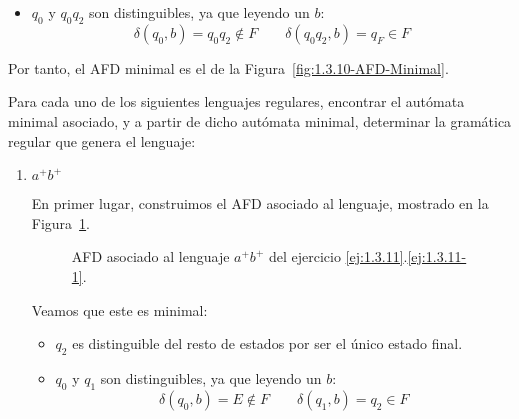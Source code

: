 \begin{ejercicio}
\begin{itemize}
        \item $q_0$ y $q_0q_2$ son distinguibles, ya que leyendo un $b$:
        \begin{equation*}
            \delta(q_0,b)=q_0q_2\notin F\qquad \delta(q_0q_2,b)=q_F\in F
        \end{equation*}
    \end{itemize}

    Por tanto, el AFD minimal es el de la Figura~\ref{fig:1.3.10-AFD-Minimal}.
\end{ejercicio}

\begin{ejercicio}\label{ej:1.3.11}
    Para cada uno de los siguientes lenguajes regulares, encontrar el autómata minimal asociado, y a partir de dicho autómata minimal, determinar la gramática regular que genera el lenguaje:
    \begin{enumerate}
        \item \label{ej:1.3.11-1}
        $a^+ b^+$
        
        En primer lugar, construimos el AFD asociado al lenguaje, mostrado en la Figura~\ref{fig:1.3.11-1-AFD}.
        \begin{figure}
            \centering
            \caption{AFD asociado al lenguaje $a^+b^+$ del ejercicio \ref{ej:1.3.11}.\ref{ej:1.3.11-1}.}
            \label{fig:1.3.11-1-AFD}
        \end{figure}

        Veamos que este es minimal:
        \begin{itemize}
            \item $q_2$ es distinguible del resto de estados por ser el único estado final.
            \item $q_0$ y $q_1$ son distinguibles, ya que leyendo un $b$:
            \begin{equation*}
                \delta(q_0,b)=E\notin F\qquad \delta(q_1,b)=q_2\in F
            \end{equation*}


\end{itemize}
\end{enumerate}
\end{ejercicio}
